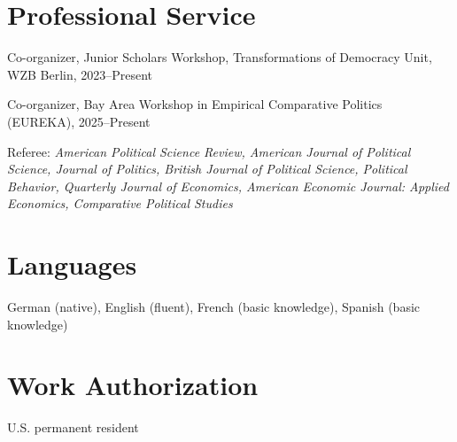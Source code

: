 \documentclass[letterpaper, 10pt]{article}
\newif\ifjobmarket
\newif\ifmerit
\renewenvironment{itemize}{
  \begin{list}{}{
    \setlength{\leftmargin}{0em}
  }
}{
  \end{list}
}
\begin{document}
\section*{Professional Service}
\begin{itemize}
  \item Co-organizer, Junior Scholars Workshop, Transformations of Democracy Unit, WZB Berlin, 2023--Present
  \ifjobmarket
  \item Publication strategy workshop leader, WZB Berlin, August 18, 2023
  \fi
  \item Co-organizer, Bay Area Workshop in Empirical Comparative Politics (EUREKA), 2025--Present
  \ifjobmarket
  \item Member, Best Graduate Paper Award Committee, APSA Migration and Citizenship Section, 2026
  \item Member, Best Article Award Committee, APSA European Politics and Society Section, 2026
  \fi
  \ifjobmarket
  \item Selected referee service: \textit{Proceedings of the National Academy of Sciences, American Political Science Review, American Journal of Political Science, Journal of Politics, British Journal of Political Science, Political Analysis, Political Science Research and Methods, Political Behavior, Quarterly Journal of Economics, American Economic Journal: Applied Economics, Comparative Political Studies, Journal of Ethnic and Migration Studies}
  \else
  \item Referee: \textit{American Political Science Review, American Journal of Political Science, Journal of Politics, British Journal of Political Science, Political Behavior, Quarterly Journal of Economics, American Economic Journal: Applied Economics, Comparative Political Studies}
  \fi
\end{itemize}

\ifjobmarket
\ifmerit\else
\vspace*{-0.1cm}
\section*{Languages}
German (native), English (fluent), French (basic knowledge), Spanish (basic knowledge)

\vspace*{-0.1cm}
\section*{Work Authorization}
U.S. permanent resident
\fi
\fi
\end{document}
